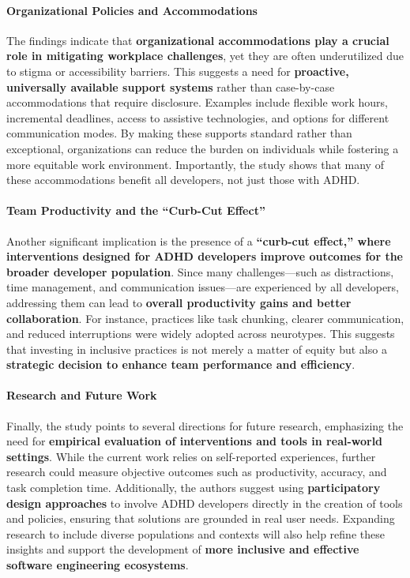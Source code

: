 \paragraph{Organizational Policies and Accommodations}
The findings indicate that \textbf{organizational accommodations play a crucial role in mitigating workplace challenges}, yet they are often underutilized due to stigma or accessibility barriers. This suggests a need for \textbf{proactive, universally available support systems} rather than case-by-case accommodations that require disclosure. Examples include flexible work hours, incremental deadlines, access to assistive technologies, and options for different communication modes. By making these supports standard rather than exceptional, organizations can reduce the burden on individuals while fostering a more equitable work environment. Importantly, the study shows that many of these accommodations benefit all developers, not just those with ADHD.

\paragraph{Team Productivity and the “Curb-Cut Effect”}
Another significant implication is the presence of a \textbf{“curb-cut effect,” where interventions designed for ADHD developers improve outcomes for the broader developer population}. Since many challenges—such as distractions, time management, and communication issues—are experienced by all developers, addressing them can lead to \textbf{overall productivity gains and better collaboration}. For instance, practices like task chunking, clearer communication, and reduced interruptions were widely adopted across neurotypes. This suggests that investing in inclusive practices is not merely a matter of equity but also a \textbf{strategic decision to enhance team performance and efficiency}.

\paragraph{Research and Future Work}
Finally, the study points to several directions for future research, emphasizing the need for \textbf{empirical evaluation of interventions and tools in real-world settings}. While the current work relies on self-reported experiences, further research could measure objective outcomes such as productivity, accuracy, and task completion time. Additionally, the authors suggest using \textbf{participatory design approaches} to involve ADHD developers directly in the creation of tools and policies, ensuring that solutions are grounded in real user needs. Expanding research to include diverse populations and contexts will also help refine these insights and support the development of \textbf{more inclusive and effective software engineering ecosystems}.
